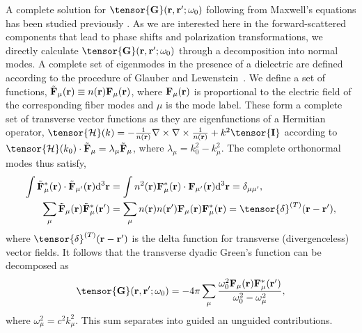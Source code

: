 \documentclass[preprint,aps,pra,onecolumn]{revtex4-1} %
\begin{document}
A complete solution for $\tensor{\mathbf{G}}(\br ,\br' ; \omega_0)$ following from Maxwell's equations 
has been studied previously \cite{sakoda_optical_1996,sondergaard_general_2001}.  As we are interested here in the forward-scattered components that lead to phase shifts and polarization transformations, we directly calculate $\tensor{\mathbf{G}}(\br ,\br' ; \omega_0)$ through a decomposition into normal modes.  A complete set of eigenmodes in the presence of a dielectric are defined according to the procedure of Glauber and Lewenstein~\cite{glauber_quantum_1991}.  We define a set of functions, $\tilde{\mathbf{F}}_\mu(\mathbf{r}) \equiv n(\mathbf{r}) \mathbf{F}_\mu (\mathbf{r})$, where $\mathbf{F}_\mu (\mathbf{r})$ is proportional to the electric field of the corresponding fiber modes and $\mu$ is the mode label.  These form a complete set of transverse vector functions as they are eigenfunctions of a Hermitian operator, 
$\tensor{\mathcal{H}}(k) = -\frac{1}{n(\br)}
\nabla\times\nabla\times \frac{1}{n(\br)} + k^2 \tensor{\mathbf{I}}$ according to 
$\tensor{\mathcal{H}}(k_0) \cdot \tilde{\mathbf{F}}_\mu = \lambda_\mu \tilde{\mathbf{F}}_\mu$, where 
$\lambda_\mu=k_0^2-k_\mu^2$.
The complete orthonormal modes thus satisfy,
\begin{align}
\int \tilde{\mathbf{F}}_\mu^* (\br)\cdot \tilde{\mathbf{F}}_{\mu'}(\br) \mathrm{d}^3\br &= \int n^2(\br) 
\mathbf{F}_\mu^* (\br)\cdot  \mathbf{F}_{\mu'}(\br) 
\mathrm{d}^3\br=\delta_{\mu\mu'},\label{eq:orthutrans}
\\
\sum_\mu \tilde{\mathbf{F}}_\mu (\br) \tilde{\mathbf{F}}_\mu^*(\br') &= \sum_\mu n(\br)n(\br') 
\mathbf{F}_\mu  (\br) \mathbf{F}_\mu^*(\br) =\tensor{\delta}^{(T)}(\br-\br'), 
\end{align}
where $\tensor{\delta}^{(T)}(\br-\br')$ is the  delta function for transverse (divergenceless) vector 
fields.  It follows that the transverse dyadic Green's function can be decomposed as~\cite{sondergaard_general_2001}
\begin{equation}
\tensor{\mathbf{G}}(\br,\br'; \omega_0) = -4\pi \sum_{\mu} \frac{\omega_0^2\mathbf{F}_\mu (\br) 
\mathbf{F}^*_\mu (\br')}{\omega_0^2-\omega_\mu^2},
\end{equation}
where $\omega_\mu^2 = c^2 k_\mu^2$.  This sum separates into guided an unguided contributions. 
\end{document}
